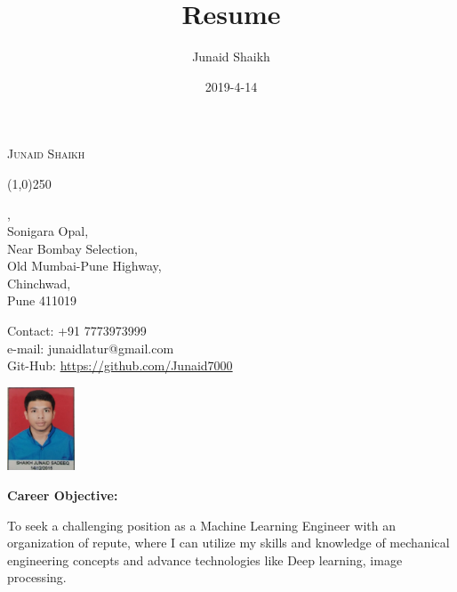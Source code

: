 \documentclass[10pt,twoside,a4paper]{article}
\title{Resume}
\date{2019-4-14}
\author{Junaid Shaikh}
\begin{document}
\begin{center}


	{\scshape \LARGE Junaid Shaikh}

	\line(1,0){250}

\end{center}



\begin{multicols}{2}

,\\
Sonigara Opal,\\
Near Bombay Selection,\\
Old Mumbai-Pune Highway,\\
Chinchwad, \\
Pune 411019 \\
\columnbreak


\begin{flushright}
Contact: +91 7773973999\\
e-mail:	junaidlatur@gmail.com\\
Git-Hub: 	\url{https://github.com/Junaid7000}\\
\end{flushright}
\end{multicols}




\begin{flushright}
\includegraphics[width=20mm]{img.jpg}
\end{flushright}

\noindent
\textbf{Career Objective:}

To seek a challenging position as a Machine Learning Engineer with an organization of repute, where I can utilize my skills and knowledge of mechanical engineering concepts and advance technologies like Deep learning, image processing.\\
\end{document}
